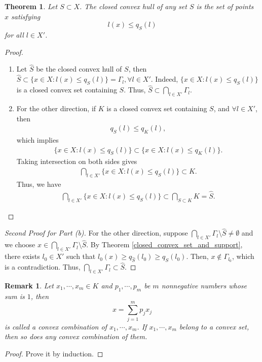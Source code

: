 \documentclass[11pt]{book}
\newtheorem{theorem}{Theorem}[chapter]
\newtheorem{remark}{Remark}[chapter]
\theoremstyle{definition}
\numberwithin{equation}{chapter}
\begin{document}
\begin{theorem}
Let $S \subset X$. The closed convex hull of any set $S$ is the set of points $x$ satisfying 
$$l(x) \leq q_S(l)$$ 
for all $l \in X'$.
\end{theorem}
\begin{proof}
~\begin{enumerate}[label=(\alph*)]
    \item Let $\hat{S}$ be the closed convex hull of $S$, then $\hat{S} \subset \{x \in X: l(x) \leq q_S(l)\} = \Gamma_l, \forall l \in X'$. Indeed, $\{x \in X: l(x) \leq q_S(l)\}$ is a closed convex set containing $S$. Thus, $\hat{S} \subset \bigcap_{l \in X'} \Gamma_l$.
    
    \item For the other direction, if $K$ is a closed convex set containing $S$, and $\forall l \in X'$, then 
    \begin{align*}
        q_S(l) \leq q_K(l),
    \end{align*}
    which implies
    \begin{align*}
        \{x \in X: l(x) \leq q_S(l)\} \subset \{x \in X: l(x) \leq q_K(l)\}.
    \end{align*}
    Taking intersection on both sides gives
    \begin{align*}
        \bigcap_{l \in X'} \{x \in X: l(x) \leq q_S(l)\} \subset K.
    \end{align*}
    Thus, we have
    \begin{align*}
        \bigcap_{l \in X'} \{x \in X: l(x) \leq q_S(l)\} \subset \bigcap_{S \subset K} K = \hat{S}.
    \end{align*}
\end{enumerate}
\end{proof}

\begin{proof}[Second Proof for Part (b)] \cite{26}
For the other direction, suppose $\bigcap_{l \in X'} \Gamma_l \setminus \hat{S} \neq \emptyset$ and we choose $x \in \bigcap_{l \in X'} \Gamma_l \setminus \hat{S}$. By Theorem \ref{closed_convex_set_and_support}, there exists $l_0 \in X'$ such that $l_0(x) \geq q_{\hat{S}}(l_0) \geq q_S(l_0)$. Then, $x \notin \Gamma_{l_0}$, which is a contradiction. Thus, $\bigcap_{l \in X'} \Gamma_l \subset \hat{S}$.
\end{proof}

\begin{remark}
Let $x_1, \cdots, x_m \in K$ and $p_1, \cdots, p_m$ be $m$ nonnegative numbers whose sum is $1$, then 
$$x = \sum^m_{j=1} p_j x_j$$ 
is called a convex combination of $x_1, \cdots, x_m$. If $x_1, \cdots, x_m$ belong to a convex set, then so does any convex combination of them.
\end{remark}
\begin{proof}
Prove it by induction.
\end{proof}
\end{document}
